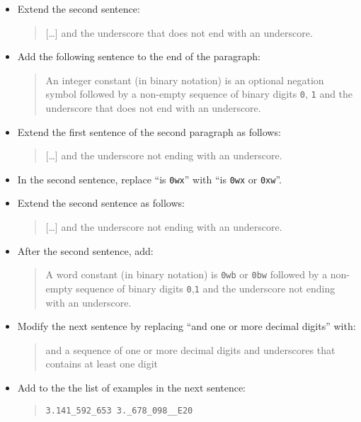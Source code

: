 \documentclass[twoside,titlepage]{article}
\begin{document}
\begin{appendix}
\begin{itemize}
\item Extend the second sentence:
  \begin{quote}
  [\dots] and the underscore that does not end with an underscore.
  \end{quote}

\item Add the following sentence to the end of the paragraph:
  \begin{quote}
  An integer constant (in binary notation) is an optional negation symbol followed by a non-empty sequence of binary digits {\tt 0}, {\tt 1} and the underscore that does not end with an underscore.
  \end{quote}

\item Extend the first sentence of the second paragraph as follows:
  \begin{quote}
  [\dots] and the underscore not ending with an underscore.
  \end{quote}

\item In the second sentence, replace ``is {\tt 0wx}'' with ``is {\tt 0wx} or {\tt 0xw}''.

\item Extend the second sentence as follows:
  \begin{quote}
  [\dots] and the underscore not ending with an underscore. 
  \end{quote}

\item After the second sentence, add:
  \begin{quote}
  A word constant (in binary notation) is {\tt 0wb} or {\tt 0bw} followed by a non-empty sequence of binary digits {\tt 0},{\tt 1} and the underscore not ending with an underscore.
  \end{quote}

\item Modify the next sentence by replacing ``and one or more decimal digits'' with: 
  \begin{quote}
   and a sequence of one or more decimal digits and underscores that contains at least one digit 
  \end{quote}

\item Add to the the list of examples in the next sentence:
  \begin{quote}
  {\tt 3.141\_592\_653  3.\_678\_098\_\_E20}
  \end{quote}


\end{itemize}
\end{appendix}
\end{document}
